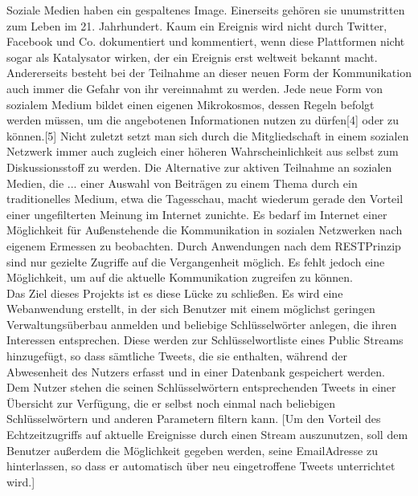 Soziale Medien haben ein gespaltenes Image. Einerseits gehören sie unumstritten zum Leben im
21. Jahrhundert. Kaum ein Ereignis wird nicht durch Twitter, Facebook und Co. dokumentiert und
kommentiert, wenn diese Plattformen nicht sogar als Katalysator wirken, der ein Ereignis erst
weltweit bekannt macht. Andererseits besteht bei der Teilnahme an dieser neuen Form der
Kommunikation auch immer die Gefahr von ihr vereinnahmt zu werden. Jede neue Form von
sozialem Medium bildet einen eigenen Mikrokosmos, dessen Regeln befolgt werden müssen, um
die angebotenen Informationen nutzen zu dürfen[4] oder zu können.[5] Nicht zuletzt setzt man sich
durch die Mitgliedschaft in einem sozialen Netzwerk immer auch zugleich einer höheren
Wahrscheinlichkeit aus selbst zum Diskussionsstoff zu werden. Die Alternative zur aktiven
Teilnahme an sozialen Medien, die ... einer Auswahl von Beiträgen zu einem Thema durch ein
traditionelles Medium, etwa die Tagesschau, macht wiederum gerade den Vorteil einer
ungefilterten Meinung im Internet zunichte. Es bedarf im Internet einer Möglichkeit für
Außenstehende die Kommunikation in sozialen Netzwerken nach eigenem Ermessen zu
beobachten. Durch Anwendungen nach dem REST­Prinzip sind nur gezielte Zugriffe auf die
Vergangenheit möglich. Es fehlt jedoch eine Möglichkeit, um auf die aktuelle Kommunikation
zugreifen zu können.\\
Das Ziel dieses Projekts ist es diese Lücke zu schließen. Es wird eine Webanwendung erstellt, in
der sich Benutzer mit einem möglichst geringen Verwaltungsüberbau anmelden und beliebige
Schlüsselwörter anlegen, die ihren Interessen entsprechen. Diese werden zur Schlüsselwortliste
eines Public Streams hinzugefügt, so dass sämtliche Tweets, die sie enthalten, während der
Abwesenheit des Nutzers erfasst und in einer Datenbank gespeichert werden. Dem Nutzer stehen
die seinen Schlüsselwörtern entsprechenden Tweets in einer Übersicht zur Verfügung, die er selbst
noch einmal nach beliebigen Schlüsselwörtern und anderen Parametern filtern kann. [Um den
Vorteil des Echtzeitzugriffs auf aktuelle Ereignisse durch einen Stream auszunutzen, soll dem
Benutzer außerdem die Möglichkeit gegeben werden, seine Email­Adresse zu hinterlassen, so dass
er automatisch über neu eingetroffene Tweets unterrichtet wird.]


